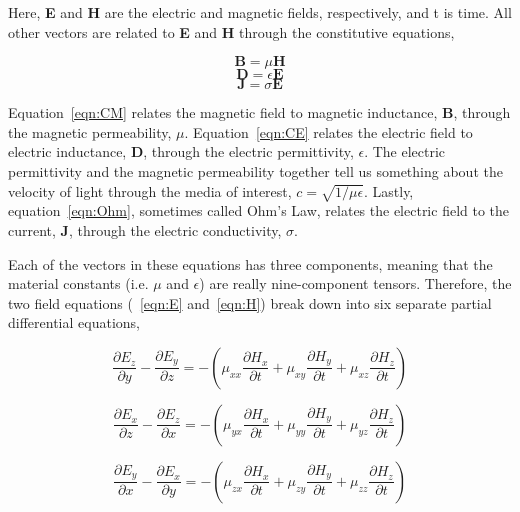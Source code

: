 \documentclass[a4paper]{article}
\begin{document}
Here, \textbf{E} and \textbf{H} are the electric and magnetic fields, respectively, and t is time. All other vectors are related to \textbf{E} and \textbf{H} through the constitutive equations, 

\begin{equation}
    \textbf{B} = \mu \textbf{H} 
    \label{eqn:CM}
\end{equation}
\begin{equation}
    \textbf{D} = \epsilon \textbf{E} 
    \label{eqn:CE}
\end{equation}
\begin{equation}
    \textbf{J} = \sigma \textbf{E}   
    \label{eqn:Ohm}
\end{equation}

Equation~\ref{eqn:CM} relates the magnetic field to magnetic inductance, \textbf{B}, through the magnetic permeability, $\mu$. Equation~\ref{eqn:CE} relates the electric field to electric inductance, \textbf{D}, through the electric permittivity, $\epsilon$. The electric permittivity and the magnetic permeability together tell us something about the velocity of light through the media of interest, $c=\sqrt{1\slash {\mu \epsilon}}$. Lastly, equation~\ref{eqn:Ohm}, sometimes called Ohm's Law,
relates the electric field to the current, \textbf{J}, through the electric conductivity, $\sigma$. 

Each of the vectors in these equations has three components, meaning that the material constants (i.e. $\mu$ and $\epsilon$) are really nine-component tensors. Therefore, the two field equations (~\ref{eqn:E} and~\ref{eqn:H}) break down into six separate partial differential equations,

\begin{equation}
    \frac{\partial E_z}{\partial y} - \frac{\partial E_y}{\partial z} = -\left( \mu_{xx}\frac{\partial H_x}{\partial t} + \mu_{xy}\frac{\partial H_y}{\partial t} + \mu_{xz}\frac{\partial H_z}{\partial t} \right)
\end{equation}

\begin{equation}
    \frac{\partial E_x}{\partial z} - \frac{\partial E_z}{\partial x} = -\left( \mu_{yx}\frac{\partial H_x}{\partial t} + \mu_{yy}\frac{\partial H_y}{\partial t} + \mu_{yz}\frac{\partial H_z}{\partial t} \right)
\end{equation}

\begin{equation}
    \frac{\partial E_y}{\partial x} - \frac{\partial E_x}{\partial y} = -\left( \mu_{zx}\frac{\partial H_x}{\partial t} + \mu_{zy}\frac{\partial H_y}{\partial t} + \mu_{zz}\frac{\partial H_z}{\partial t} \right)
\end{equation}
\end{document}

